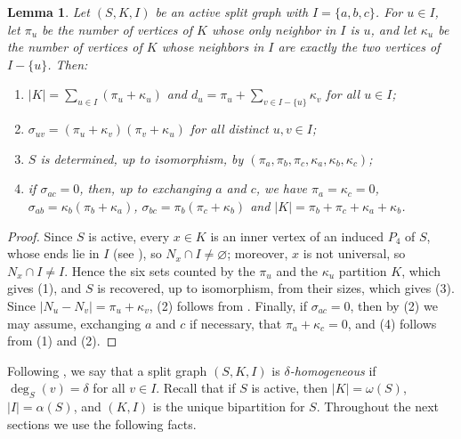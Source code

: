 \documentclass[11pt]{article}
\newtheorem{lemma}[lemma]{Lemma}
\begin{document}
\begin{lemma}
	\label{S_activo_|I|=3}
	Let $(S,K,I)$ be an active split graph with $I=\{a,b,c\}$. For $u\in I$, let $\pi_u$ be the number of vertices of $K$ whose only neighbor in $I$ is $u$, and let $\kappa_u$ be the number of vertices of $K$ whose neighbors in $I$ are exactly the two vertices of $I-\{u\}$. Then:
	\begin{enumerate}
		\item $|K|=\sum_{u\in I}(\pi_u+\kappa_u)$ and $d_u=\pi_u+\sum_{v\in I-\{u\}}\kappa_v$ for all $u\in I$;
		\item $\sigma_{uv}=(\pi_u+\kappa_v)(\pi_v+\kappa_u)$ for all distinct $u,v\in I$;
		\item $S$ is determined, up to isomorphism, by $(\pi_a,\pi_b,\pi_c,\kappa_a,\kappa_b,\kappa_c)$;
		\item if $\sigma_{ac}=0$, then, up to exchanging $a$ and $c$, we have $\pi_a=\kappa_c=0$, $\sigma_{ab}=\kappa_b(\pi_b+\kappa_a)$, $\sigma_{bc}=\pi_b(\pi_c+\kappa_b)$ and $|K|=\pi_b+\pi_c+\kappa_a+\kappa_b$.
	\end{enumerate}
\end{lemma}

\begin{proof}
	Since $S$ is active, every $x\in K$ is an inner vertex of an induced $P_4$ of $S$, whose ends lie in $I$ (see \cite{pastine2025simple}), so $N_x\cap I\neq\varnothing$; moreover, $x$ is not universal, so $N_x\cap I\neq I$. Hence the six sets counted by the $\pi_u$ and the $\kappa_u$ partition $K$, which gives (1), and $S$ is recovered, up to isomorphism, from their sizes, which gives (3). Since $|N_u-N_v|=\pi_u+\kappa_v$, (2) follows from . Finally, if $\sigma_{ac}=0$, then by (2) we may assume, exchanging $a$ and $c$ if necessary, that $\pi_a+\kappa_c=0$, and (4) follows from (1) and (2).
\end{proof}

Following \cite{pastine2025simple}, we say that a split graph $(S,K,I)$ is \emph{$\delta$-homogeneous} if $\deg_S(v)=\delta$ for all $v\in I$. Recall that if $S$ is active, then $|K|=\omega(S)$, $|I|=\alpha(S)$, and $(K,I)$ is the unique bipartition for $S$. Throughout the next sections we use the following facts.
\end{document}
